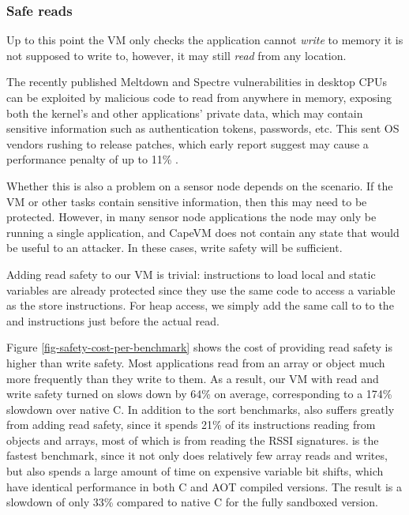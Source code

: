 \subsubsection{Safe reads}
Up to this point the VM only checks the application cannot \emph{write} to memory it is not supposed to write to, however, it may still \emph{read} from any location.

The recently published Meltdown and Spectre vulnerabilities in desktop CPUs can be exploited by malicious code to read from anywhere in memory, exposing both the kernel's and other applications' private data, which may contain sensitive information such as authentication tokens, passwords, etc. This sent OS vendors rushing to release patches, which early report suggest may cause a performance penalty of up to 11\% \cite{Simakov:2018wp}.

Whether this is also a problem on a sensor node depends on the scenario. If the VM or other tasks contain sensitive information, then this may need to be protected. However, in many sensor node applications the node may only be running a single application, and CapeVM does not contain any state that would be useful to an attacker. In these cases, write safety will be sufficient.

Adding read safety to our VM is trivial: instructions to load local and static variables are already protected since they use the same code to access a variable as the store instructions. For heap access, we simply add the same call to  to the  and  instructions just before the actual read.

Figure \ref{fig-safety-cost-per-benchmark} shows the cost of providing read safety is higher than write safety. Most applications read from an array or object much more frequently than they write to them. As a result, our VM with read and write safety turned on slows down by 64\% on average, corresponding to a 174\% slowdown over native C. In addition to the sort benchmarks,  also suffers greatly from adding read safety, since it spends 21\% of its instructions reading from objects and arrays, most of which is from reading the RSSI signatures.  is the fastest benchmark, since it not only does relatively few array reads and writes, but also spends a large amount of time on expensive variable bit shifts, which have identical performance in both C and AOT compiled versions. The result is a slowdown of only 33\% compared to native C for the fully sandboxed version.

